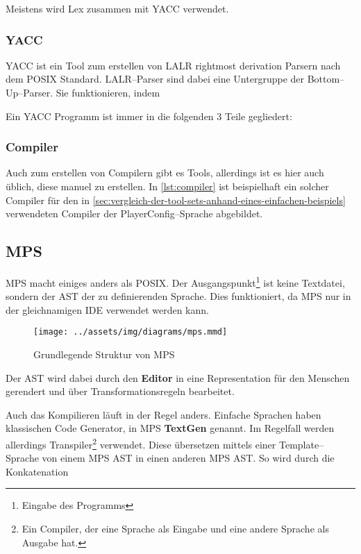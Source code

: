 Meistens wird Lex zusammen mit \ac{YACC} verwendet.

\subsubsection{\acs{YACC}}
\ac{YACC} ist ein Tool zum erstellen von \ac{LALR} rightmost derivation Parsern nach dem \ac{POSIX} Standard.
\acs{LALR}--Parser sind dabei eine Untergruppe der Bottom--Up--Parser.
Sie funktionieren, indem \lipsum[5]

Ein \ac{YACC} Programm ist immer in die folgenden 3 Teile gegliedert:

\lipsum[5]

\subsubsection{Compiler}
Auch zum erstellen von Compilern gibt es Tools, allerdings ist es hier auch üblich, diese manuel zu erstellen.
In \autoref{lst:compiler} ist beispielhaft ein solcher Compiler für den in \autoref{sec:vergleich-der-tool-sets-anhand-eines-einfachen-beispiels} verwendeten Compiler der PlayerConfig--Sprache abgebildet.

\lipsum[5]

\subsection{\acl{MPS}}\label{subsec:meta-programming-system}
\ac{MPS} macht einiges anders als \ac{POSIX}.
Der Ausgangspunkt\footnote{Eingabe des Programms} ist keine Textdatei, sondern der \ac{AST} der zu definierenden Sprache.
Dies funktioniert, da \ac{MPS} nur in der gleichnamigen \ac{IDE} verwendet werden kann.

\begin{wrapfigure}{lH}{0.5\textwidth}
    \begin{center}
        \texttt{[image: ../assets/img/diagrams/mps.mmd]}
    \end{center}
    \caption{Grundlegende Struktur von \acs{MPS}}
    \label{fig:mps}
\end{wrapfigure}
Der \ac{AST} wird dabei durch den \textbf{Editor} in eine Representation für den Menschen gerendert und über Transformationsregeln bearbeitet.

Auch das Kompilieren läuft in der Regel anders.
Einfache Sprachen haben klassischen Code Generator, in \ac{MPS} \textbf{TextGen} genannt.
Im Regelfall werden allerdings Transpiler\footnote{Ein Compiler, der eine Sprache als Eingabe und eine andere Sprache als Ausgabe hat.} verwendet.
Diese übersetzen mittels einer Template--Sprache von einem \ac{MPS} \ac{AST} in einen anderen \ac{MPS} \ac{AST}.
So wird durch die Konkatenation


